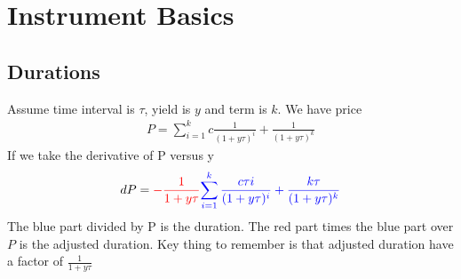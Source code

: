 \section{Instrument Basics}
\subsection{Durations}
Assume time interval is $\tau$, yield is $y$ and term is $k$. We have price
\begin{equation}
\begin{aligned}
P = \sum_{i=1} ^ k c\frac{1}{(1 + y\tau) ^ i} + \frac{1}{(1 + y\tau) ^ k}
\end{aligned}
\end{equation}
If we take the derivative of P versus y
\begin{equation}
\begin{aligned}
dP = {\color{red}-\frac{1}{1 + y\tau}} {\color{blue}\sum_{i=1} ^ k \frac{c\tau i}{(1 + y\tau) ^ i} + \frac{k\tau}{(1 + y\tau) ^ k}}
\end{aligned}
\end{equation}
The blue part divided by P is the duration. The red part times the blue part over $P$ is the adjusted duration. Key thing to remember is that adjusted duration have a factor of $\frac{1}{1 + y\tau}$